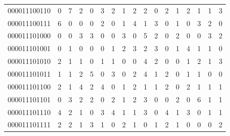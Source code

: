 \documentclass[10pt,a4paper]{article}
\begin{document}
\begin{longtable}{ |c|c|c|c|c|c|c|c|c|c|c|c|c|c|c|c|c| }
    000011100110              & 0                            & 7                                & 2                            & 0                              & 3   & 2   & 1   & 2   & 2   & 0   & 2   & 1   & 2   & 1   & 1   & 3   \\
    000011100111              & 6                            & 0                                & 0                            & 0                              & 2   & 0   & 1   & 4   & 1   & 3   & 0   & 1   & 0   & 3   & 2   & 0   \\
    000011101000              & 0                            & 0                                & 3                            & 3                              & 0   & 0   & 3   & 0   & 5   & 2   & 0   & 2   & 0   & 0   & 3   & 2   \\
    000011101001              & 0                            & 1                                & 0                            & 0                              & 0   & 1   & 2   & 3   & 2   & 3   & 0   & 1   & 4   & 1   & 1   & 0   \\
    000011101010              & 2                            & 1                                & 1                            & 0                              & 1   & 1   & 0   & 0   & 4   & 2   & 0   & 0   & 1   & 2   & 1   & 3   \\
    000011101011              & 1                            & 1                                & 2                            & 5                              & 0   & 3   & 0   & 2   & 4   & 1   & 2   & 0   & 1   & 1   & 0   & 0   \\
    000011101100              & 2                            & 1                                & 4                            & 2                              & 4   & 0   & 1   & 2   & 1   & 1   & 2   & 0   & 2   & 1   & 1   & 1   \\
    000011101101              & 0                            & 3                                & 2                            & 2                              & 0   & 2   & 1   & 2   & 3   & 0   & 0   & 2   & 0   & 6   & 1   & 1   \\
    000011101110              & 4                            & 2                                & 1                            & 0                              & 3   & 4   & 1   & 1   & 3   & 0   & 4   & 1   & 3   & 0   & 1   & 1   \\
    000011101111              & 2                            & 2                                & 1                            & 3                              & 1   & 0   & 2   & 1   & 0   & 1   & 2   & 1   & 0   & 0   & 0   & 2   \\

\end{longtable}
\end{document}
